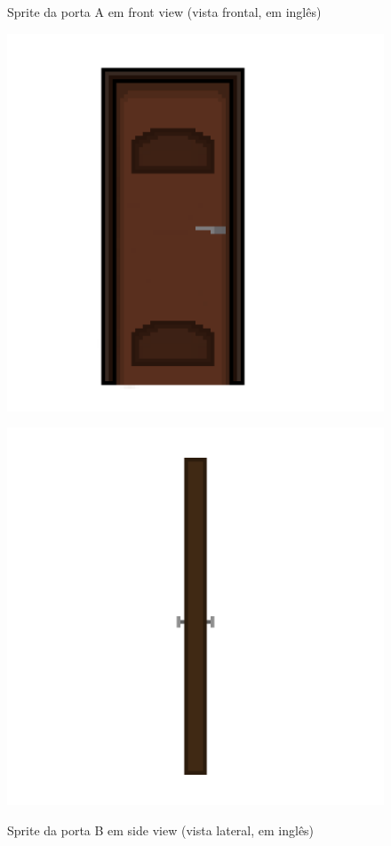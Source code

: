 \begin{figure}[htbp]
    \centering
    \begin{minipage}{0.45\textwidth}
    \caption{\small Sprite da porta A em front view (vista frontal, em inglês)}
    \includegraphics[width=1\linewidth]{figs/sprites/Porta front view.png}
    \label{fig:portaA}
    \end{minipage}\hfill
    \begin{minipage}{0.45\textwidth}
    \caption{\small Sprite da porta B em side view (vista lateral, em inglês)}
    \includegraphics[width=1\linewidth]{figs/sprites/Porta side view.png}
    \label{fig:portaB}
    \end{minipage}\hfill
\end{figure}



